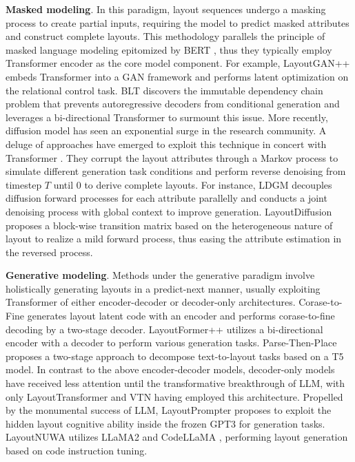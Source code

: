 \textbf{Masked modeling}. In this paradigm, layout sequences undergo a masking process to create partial inputs, requiring the model to predict masked attributes and construct complete layouts. This methodology parallels the principle of masked language modeling epitomized by BERT \cite{bert2019devlin}, thus they typically employ Transformer encoder as the core model component. For example, LayoutGAN++ \cite{layoutganpp2021kikuchi} embeds Transformer into a GAN framework and performs latent optimization on the relational control task. BLT \cite{blt2022kong} discovers the immutable dependency chain problem that prevents autoregressive decoders from conditional generation and leverages a bi-directional Transformer to surmount this issue. More recently, diffusion model \cite{diffusion2020jonathan} has seen an exponential surge in the research community. A deluge of approaches have emerged to exploit this technique in concert with Transformer \cite{layoutdm2023Inoue,LDGM2023hui,layoutdiff2023zhang,layoutdm2023chai,dlt2023levi}. They corrupt the layout attributes through a Markov process to simulate different generation task conditions and perform reverse denoising from timestep $T$ until 0 to derive complete layouts. For instance, LDGM \cite{LDGM2023hui} decouples diffusion forward processes for each attribute parallelly and conducts a joint denoising process with global context to improve generation. LayoutDiffusion \cite{layoutdiff2023zhang} proposes a block-wise transition matrix based on the heterogeneous nature of layout to realize a mild forward process, thus easing the attribute estimation in the reversed process.

\textbf{Generative modeling}. Methods under the generative paradigm involve holistically generating layouts in a predict-next manner, usually exploiting Transformer of either encoder-decoder or decoder-only architectures. Corase-to-Fine \cite{ctf2022jiang} generates layout latent code with an encoder and performs corase-to-fine decoding by a two-stage decoder. LayoutFormer++ \cite{layouttfpp2023jiang} utilizes a bi-directional encoder with a decoder to perform various generation tasks. Parse-Then-Place \cite{lin2023iccv} proposes a two-stage approach to decompose text-to-layout tasks based on a T5 \cite{t52020jmlr} model. In contrast to the above encoder-decoder models, decoder-only models have received less attention until the transformative breakthrough of LLM, with only LayoutTransformer \cite{layouttf2021gupta} and VTN \cite{vtn2021arroyo} having employed this architecture. Propelled by the monumental success of LLM, LayoutPrompter \cite{layoutprompter2023lin} proposes to exploit the hidden layout cognitive ability inside the frozen GPT3 for generation tasks. LayoutNUWA \cite{layoutnuwa2024tang} utilizes LLaMA2 \cite{llama22023touvron} and CodeLLaMA \cite{codellmam2023roziere}, performing layout generation based on code instruction tuning.

